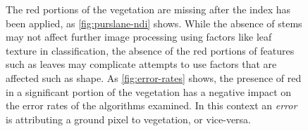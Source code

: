 \documentclass[agriculture,article,submit,pdftex,moreauthors]{Definitions/mdpi}
\begin{document}
\begin{figure}[H]
	\centering
	\hfill
	\hfill
	\caption[Missing red portions of vegetation]{The red portions of the vegetation are missing after the index has been applied, as \ref{fig:purslane-ndi} shows. While the absence of stems may not affect further image processing using factors like leaf texture in classification, the absence of the red portions of features such as leaves may complicate attempts to use factors that are affected such as shape. As \ref{fig:error-rates} shows, the presence of red in a significant portion of the vegetation has a negative impact on the error rates of the algorithms examined. In this context an \textit{error} is attributing a ground pixel to vegetation, or vice-versa.}
	\label{fig:segmentation-color-problem}
\end{figure}
\end{document}
